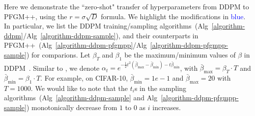 Here we demonstrate the ``zero-shot" transfer of hyperparameters from DDPM to PFGM++, using the $r=\sigma\sqrt{D}$ formula. We highlight the modifications in \textcolor{blue}{blue}. In particular, we list the DDPM training/sampling algorithms~(Alg~\ref{algorithm-ddpm}/Alg~\ref{algorithm-ddpm-sample}), and their counterparts in PFGM++~(Alg~\ref{algorithm-ddpm-pfgmpp}/Alg~\ref{algorithm-ddpm-pfgmpp-sample}) for comparions. Let $\beta_T$ and $\beta_1$ be the maximum/minimum values of $\beta$ in DDPM~\cite{Ho2020DenoisingDP}. Similar to \citet{Song2021ScoreBasedGM}, we denote $\alpha_{t}=e^{-\frac12t^2(\bar{\beta}_{\textrm{max}}-\bar{\beta}_{\textrm{min}}) - t\bar{\beta}_{\textrm{min}}}$, with $\bar{\beta}_{\textrm{max}}=\beta_T  \cdot T$ and $\bar{\beta}_{\textrm{min}}=\beta_1\cdot T$. For example, on CIFAR-10, $\bar{\beta}_{\textrm{min}}=1e-1$ and $\bar{\beta}_{\textrm{max}}=20$ with $T=1000$. We would like to note that the $t_i$s in the sampling algorithms~(Alg~\ref{algorithm-ddpm-sample} and Alg~\ref{algorithm-ddpm-pfgmpp-sample}) monotonically decrease from $1$ to $0$ as $i$ increases.

